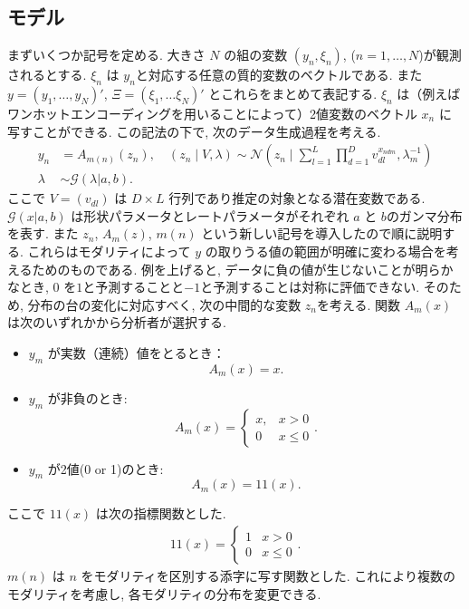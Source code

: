\documentclass[a4paper,12ptc]{jsarticle} %
\newcommand{\gam}{\mathcal{G}}
\newcommand{\one}{1\!\!1}
\begin{document}
\subsection{モデル}
まずいくつか記号を定める. 大きさ $N$ の組の変数 $(y_n, \xi_n)$, ($n=1,\ldots, N$)が観測されるとする. $\xi_n$ は $y_n$と対応する任意の質的変数のベクトルである. また $y=(y_1, \ldots, y_N)'$, $\Xi=(\xi_1, \ldots \xi_N)'$ とこれらをまとめて表記する.
$\xi_n$ は（例えばワンホットエンコーディングを用いることによって）2値変数のベクトル $x_n$ に写すことができる. この記法の下で, 次のデータ生成過程を考える.
\begin{align}
y_{n} &= A_{m(n)}(z_{n}), \quad (z_{n} \mid V, \lambda) \sim \mathcal{N}\left(z_n \mid \sum_{l=1}^L \prod_{d=1}^Dv_{dl}^{x_{ndm}}, \lambda^{-1}_m\right)  \label{eq_mod1}\\
\lambda & \sim \gam(\lambda | a,b). \nonumber
\end{align}
ここで $V=(v_{dl})$ は $D \times L$  行列であり推定の対象となる潜在変数である. $\gam(x|a,b)$ は形状パラメータとレートパラメータがそれぞれ $a$ と $b$のガンマ分布を表す. また $z_n$, $A_{m}(z)$, $m(n)$ という新しい記号を導入したので順に説明する. これらはモダリティによって $y$ の取りうる値の範囲が明確に変わる場合を考えるためのものである.
例を上げると, データに負の値が生じないことが明らかなとき, $0$ を$1$と予測することと$-1$と予測することは対称に評価できない.
そのため, 分布の台の変化に対応すべく, 次の中間的な変数 $z_n$を考える.
関数 $A_m(x)$ は次のいずれかから分析者が選択する.
\begin{itemize}
\item $y_m$ が実数（連続）値をとるとき： 
$$
A_m(x)=x.
$$
\item $y_m$ が非負のとき:
$$
A_m(x)=\begin{cases}x, &x>0\\0 &x\leq 0\end{cases}.
$$
\item
$y_m$ が2値(0 or 1)のとき:
$$
A_m(x)=\one(x).
$$
\end{itemize}
ここで $\one(x)$ は次の指標関数とした.
\begin{align*}
    \one(x)=\begin{cases} 1 & x>0\\
    0 &x \leq 0\end{cases}.
\end{align*}
$m(n)$ は $n$ をモダリティを区別する添字に写す関数とした. これにより複数のモダリティを考慮し, 各モダリティの分布を変更できる.
\end{document}
